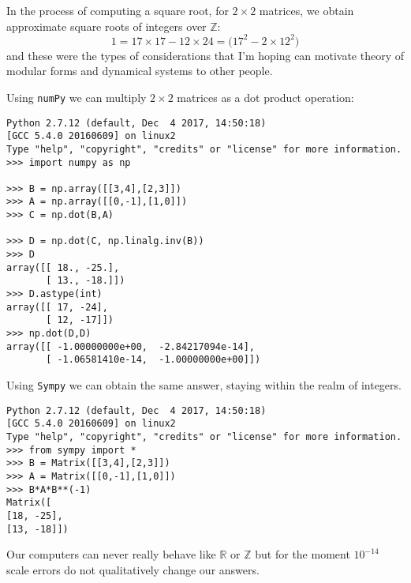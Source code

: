 \documentclass[12pt]{article}
\begin{document}
In the process of computing a square root, for $2 \times 2$ matrices, we obtain approximate square roots of integers over $\mathbb{Z}$:
$$ 1 = 17 \times 17 - 12 \times 24 = \bigg( 17^2 - 2 \times 12^2 \bigg)  $$
and these were the types of considerations that I'm hoping can motivate theory of modular forms and dynamical systems to other people.

\newpage \noindent Using {\tt numPy} we can multiply $2 \times 2$ matrices as a dot product operation:

\begin{verbatim}
Python 2.7.12 (default, Dec  4 2017, 14:50:18) 
[GCC 5.4.0 20160609] on linux2
Type "help", "copyright", "credits" or "license" for more information.
>>> import numpy as np

>>> B = np.array([[3,4],[2,3]])
>>> A = np.array([[0,-1],[1,0]])
>>> C = np.dot(B,A)

>>> D = np.dot(C, np.linalg.inv(B))
>>> D
array([[ 18., -25.],
       [ 13., -18.]])
>>> D.astype(int)
array([[ 17, -24],
       [ 12, -17]])
>>> np.dot(D,D)
array([[ -1.00000000e+00,  -2.84217094e-14],
       [ -1.06581410e-14,  -1.00000000e+00]])

\end{verbatim}
Using {\tt Sympy} we can obtain the same answer, staying within the realm of integers.
\begin{verbatim}
Python 2.7.12 (default, Dec  4 2017, 14:50:18) 
[GCC 5.4.0 20160609] on linux2
Type "help", "copyright", "credits" or "license" for more information.
>>> from sympy import *
>>> B = Matrix([[3,4],[2,3]])
>>> A = Matrix([[0,-1],[1,0]])
>>> B*A*B**(-1)
Matrix([
[18, -25],
[13, -18]])
\end{verbatim}
Our computers can never really behave like $\mathbb{R}$ or $\mathbb{Z}$ but for the moment $10^{-14}$ scale errors do not qualitatively change our answers. 
\end{document}

